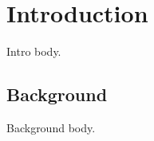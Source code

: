 \section{Introduction}
\label{sec:intro}

Intro body.

\subsection{Background}
\label{sec:bg}

Background body.
